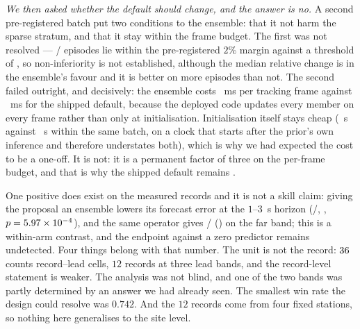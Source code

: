 \documentclass[review]{elsarticle}
\begin{document}
\emph{We then asked whether the default should change, and the answer is no.} A
second pre-registered batch put two conditions to the ensemble: that it not harm the
sparse stratum, and that it stay within the frame budget. The first was not resolved
--- \TEightK{}/\TEightN{} episodes lie within the pre-registered $2\%$ margin against
a threshold of \TEightThresh{}, so non-inferiority is not established, although the
median relative change is \TEightRel{} in the ensemble's favour and it is better on
more episodes than not. The second failed outright, and decisively: the ensemble
costs \TEightFrameThree{}~ms per tracking frame against \TEightFrameOne{}~ms for the
shipped default, because the deployed code updates every member on every frame rather
than only at initialisation. Initialisation itself stays cheap
(\TEightInitThree{}~s against \TEightInitOne{}~s within the same batch, on a clock
that starts after the prior's own inference and therefore understates both), which is
why we had expected the cost to be a one-off. It is not: it is a permanent factor of
three on the per-frame budget, and that is why the shipped default remains
\DepLearnedEnsK{}.

One positive does exist on the measured records and it is not a
skill claim: giving the proposal an ensemble lowers its forecast error at the
$1$--$3$~s horizon (\TFiveBetter{}/\TFiveN{}, \TFiveRel{}, $p=5.97\times 10^{-4}{}$), and the
same operator gives \TFiveFarBetter{}/\TFiveN{} (\TFiveFarRel{}) on the far
band; this is a within-arm contrast, and the endpoint against a zero predictor
remains undetected.
Four things belong with that number. The unit is not the record: $36{}$ counts
record--lead cells, $12$ records at three lead bands, and the record-level statement
is weaker. The analysis was not blind, and one of the two bands was partly
determined by an answer we had already seen. The smallest win rate the design could
resolve was $0.742$. And the $12$ records come from four fixed stations, so nothing
here generalises to the site level.
\end{document}
